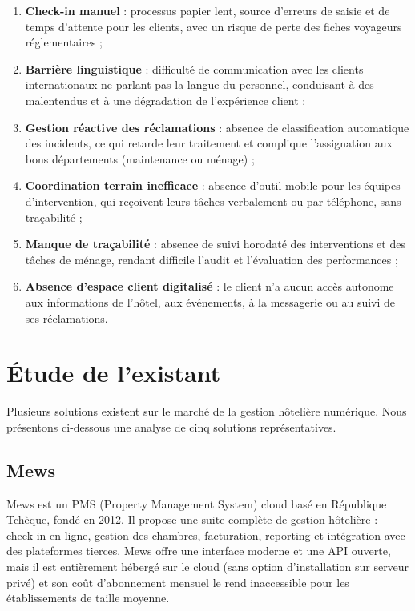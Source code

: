 \begin{enumerate}
  \item \textbf{Check-in manuel} : processus papier lent, source d'erreurs de saisie et de temps d'attente pour les clients, avec un risque de perte des fiches voyageurs réglementaires ;
  \item \textbf{Barrière linguistique} : difficulté de communication avec les clients internationaux ne parlant pas la langue du personnel, conduisant à des malentendus et à une dégradation de l'expérience client ;
  \item \textbf{Gestion réactive des réclamations} : absence de classification automatique des incidents, ce qui retarde leur traitement et complique l'assignation aux bons départements (maintenance ou ménage) ;
  \item \textbf{Coordination terrain inefficace} : absence d'outil mobile pour les équipes d'intervention, qui reçoivent leurs tâches verbalement ou par téléphone, sans traçabilité ;
  \item \textbf{Manque de traçabilité} : absence de suivi horodaté des interventions et des tâches de ménage, rendant difficile l'audit et l'évaluation des performances ;
  \item \textbf{Absence d'espace client digitalisé} : le client n'a aucun accès autonome aux informations de l'hôtel, aux événements, à la messagerie ou au suivi de ses réclamations.
\end{enumerate}

\section{Étude de l'existant}
\label{sec:etude_existant}

Plusieurs solutions existent sur le marché de la gestion hôtelière numérique. Nous présentons ci-dessous une analyse de cinq solutions représentatives.

\subsection{Mews}

Mews est un PMS (Property Management System) cloud basé en République Tchèque, fondé en 2012. Il propose une suite complète de gestion hôtelière : check-in en ligne, gestion des chambres, facturation, reporting et intégration avec des plateformes tierces. Mews offre une interface moderne et une API ouverte, mais il est entièrement hébergé sur le cloud (sans option d'installation sur serveur privé) et son coût d'abonnement mensuel le rend inaccessible pour les établissements de taille moyenne.

